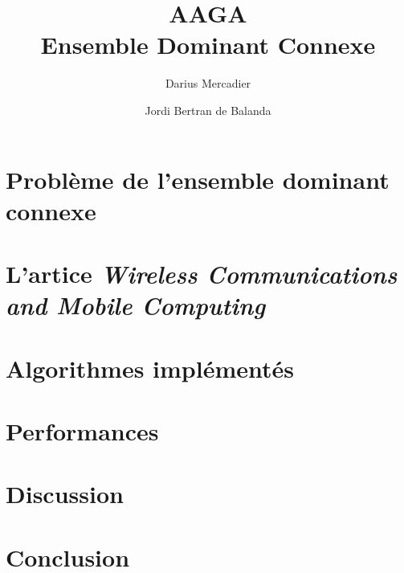 \documentclass{article}
\title{
  AAGA \\
  Ensemble Dominant Connexe
}
\author{Darius Mercadier \and Jordi Bertran de Balanda}
\begin{document}
\maketitle

\section{Problème de l'ensemble dominant connexe}

\section{L'artice \emph{Wireless Communications and Mobile Computing}}

\section{Algorithmes implémentés}

\section{Performances}

\section{Discussion}

\section{Conclusion}
\end{document}
